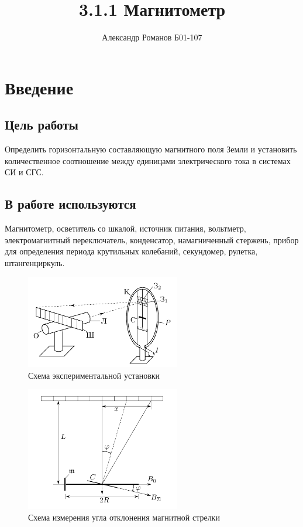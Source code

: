 \documentclass{article}
\author{Александр Романов Б01-107}
\date{}
\title{3.1.1 Магнитометр}
\begin{document}
\maketitle
\section{Введение}
\subsection{Цель работы}
Определить горизонтальную составляющую магнитного поля Земли и установить количественное соотношение между
единицами электрического тока в системах СИ и СГС.
\subsection{В работе используются}
Магнитометр, осветитель со шкалой, источ­ник питания, вольтметр, электромагнитный переключатель, конденсатор,
намагниченный стержень, прибор для определения периода крутильных
колебаний, секундомер, рулетка, штангенциркуль.
\begin{figure}[H]
    \centering
    \includegraphics[width=0.6\textwidth]{scheme.png}
    \caption{Схема экспериментальной установки}
    \label{fig:sheme}
\end{figure}

\begin{figure}[H]
    \centering
    \includegraphics[width=0.6\textwidth]{angles.png}
    \caption{Схема измерения угла отклонения магнитной стрелки}
    \label{fig:sheme}
\end{figure}
\end{document}
